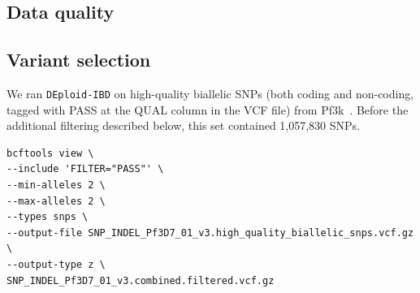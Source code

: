 \documentclass{article}
\begin{document}

\subsection{Data quality}


\subsection{Variant selection}
We ran {\tt DEploid-IBD} on high-quality biallelic SNPs (both coding and non-coding, tagged with PASS at the QUAL column in the VCF file) from Pf3k~\citep{pf3k}. Before the additional filtering described below, this set contained 1,057,830 SNPs.
\linespread{1}
\begin{lstlisting}
bcftools view \
--include 'FILTER="PASS"' \
--min-alleles 2 \
--max-alleles 2 \
--types snps \
--output-file SNP_INDEL_Pf3D7_01_v3.high_quality_biallelic_snps.vcf.gz \
--output-type z \
SNP_INDEL_Pf3D7_01_v3.combined.filtered.vcf.gz
\end{lstlisting}
\end{document}
